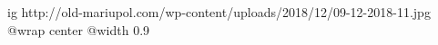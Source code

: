  
 
 
 
 

\ifcmt
  ig http://old-mariupol.com/wp-content/uploads/2018/12/09-12-2018-11.jpg
  @wrap center
  @width 0.9
\fi
